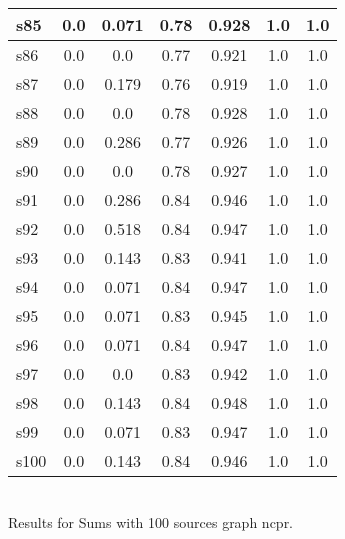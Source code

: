 \documentclass{article}
\begin{document}
\begin{tabular}{|l|c|c|c|c|c|c|}
\hline
s85 &0.0 & 0.071 & 0.78 & 0.928 & 1.0 & 1.0\\
\hline
s86 &0.0 & 0.0 & 0.77 & 0.921 & 1.0 & 1.0\\
\hline
s87 &0.0 & 0.179 & 0.76 & 0.919 & 1.0 & 1.0\\
\hline
s88 &0.0 & 0.0 & 0.78 & 0.928 & 1.0 & 1.0\\
\hline
s89 &0.0 & 0.286 & 0.77 & 0.926 & 1.0 & 1.0\\
\hline
s90 &0.0 & 0.0 & 0.78 & 0.927 & 1.0 & 1.0\\
\hline
s91 &0.0 & 0.286 & 0.84 & 0.946 & 1.0 & 1.0\\
\hline
s92 &0.0 & 0.518 & 0.84 & 0.947 & 1.0 & 1.0\\
\hline
s93 &0.0 & 0.143 & 0.83 & 0.941 & 1.0 & 1.0\\
\hline
s94 &0.0 & 0.071 & 0.84 & 0.947 & 1.0 & 1.0\\
\hline
s95 &0.0 & 0.071 & 0.83 & 0.945 & 1.0 & 1.0\\
\hline
s96 &0.0 & 0.071 & 0.84 & 0.947 & 1.0 & 1.0\\
\hline
s97 &0.0 & 0.0 & 0.83 & 0.942 & 1.0 & 1.0\\
\hline
s98 &0.0 & 0.143 & 0.84 & 0.948 & 1.0 & 1.0\\
\hline
s99 &0.0 & 0.071 & 0.83 & 0.947 & 1.0 & 1.0\\
\hline
s100 &0.0 & 0.143 & 0.84 & 0.946 & 1.0 & 1.0\\
\hline
\end{tabular}\\

\noindent Results for Sums with 100 sources graph ncpr.
\end{document}
